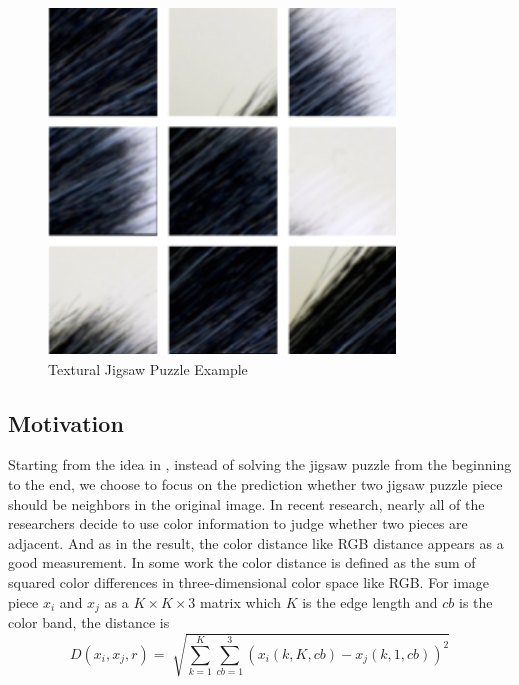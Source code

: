 \documentclass{article}
\begin{document}
\begin{figure}
\begin{minipage}{\textwidth}
\begin{minipage}{.49\textwidth}
\begin{minipage}{.49\textwidth}
            \end{minipage}
            \begin{minipage}{.49\textwidth}
                \centering
                \includegraphics[width=\textwidth]{puzzle_texure}
            \end{minipage}
            \caption{Textural Jigsaw Puzzle Example}
            \label{fig:texurejigsawpuzzle}
        \end{minipage}
    \end{minipage}
\end{figure}

\subsection{Motivation}

Starting from the idea in \cite{sholomon2016dnn}, instead of solving the jigsaw puzzle from the beginning to the end, we choose to focus on the prediction whether two jigsaw puzzle piece should be neighbors in the original image. In recent research, nearly all of the researchers decide to use color information to judge whether two pieces are adjacent. And as in the result, the color distance like RGB distance appears as a good measurement. In some work\cite{sholomon2013genetic} the color distance is defined as the sum of squared color differences in three-dimensional color space like RGB. For image piece $x_i$ and $x_j$ as a $K\times K\times 3$ matrix which $K$ is the edge length and $cb$ is the color band, the distance is
$$
D(x_i,x_j,r)=\sqrt[]{\sum^K_{k=1}\sum^3_{cb=1}(x_i(k,K,cb)-x_j(k,1,cb))^2}
$$
\end{document}
